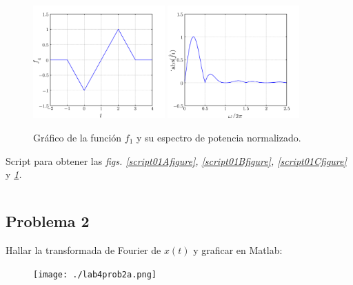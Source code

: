 \documentclass[a4paper,12pt,final]{article}
\begin{document}
      \begin{figure}[H]
        \caption{Gráfico de la función $f_1$ y su espectro de potencia normalizado.}
        \label{script01Dfigure}
        \begin{center}
          \includegraphics[width=0.45\textwidth]{./laboratorio_4/problema01_f4.png}
          \includegraphics[width=0.45\textwidth]{./laboratorio_4/problema01_F4.png}
        \end{center}
      \end{figure}

      \begin{listing}[H]
        \caption{Script para obtener las \emph{figs. \ref{script01Afigure}, \ref{script01Bfigure}, \ref{script01Cfigure}} y \emph{\ref{script01Dfigure}.}}
        \label{script01G}
        \inputminted{matlab}{./laboratorio_4/problema01.m}
      \end{listing}\vspace{-1.0em}

  \newpage
  \subsection*{Problema 2}
    \noindent Hallar la transformada de Fourier de $x\left(t\right)$ y graficar en Matlab:

      \begin{figure}[H]
        \begin{center}
          \texttt{[image: ./lab4prob2a.png]}
        \end{center}
      \end{figure}\vspace{-1.5em}
\end{document}
